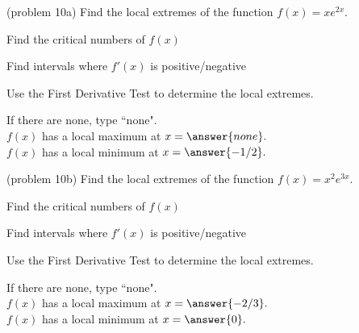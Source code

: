 \documentclass[handout]{ximera}
\begin{document}
\begin{example}[example 10]
\begin{image}
\end{image}
\end{example}

\begin{problem}(problem 10a)
Find the local extremes of the function $f(x) = xe^{2x}.$\\
\begin{hint}
Find the critical numbers of $f(x)$
\end{hint}
\begin{hint}
Find intervals where $f'(x)$ is positive/negative
\end{hint}
\begin{hint}
Use the First Derivative Test to determine the local extremes.
\end{hint}

If there are none, type ``none".\\
$f(x)$ has a local maximum at $x = \answer{none}.$\\
$f(x)$ has a local minimum at $x = \answer{-1/2}.$
\end{problem}


\begin{problem}(problem 10b)
Find the local extremes of the function $f(x) = x^2e^{3x}.$\\
\begin{hint}
Find the critical numbers of $f(x)$
\end{hint}
\begin{hint}
Find intervals where $f'(x)$ is positive/negative
\end{hint}
\begin{hint}
Use the First Derivative Test to determine the local extremes.
\end{hint}

If there are none, type ``none".\\
$f(x)$ has a local maximum at $x = \answer{-2/3}.$\\
$f(x)$ has a local minimum at $x = \answer{0}.$
\end{problem}
\end{document}
